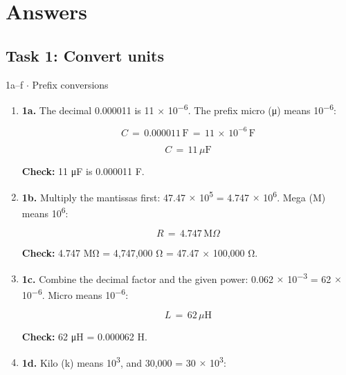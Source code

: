 \documentclass[11pt]{article}
\begin{document}
\section{Answers}
\begin{keepsection}\subsection{Task 1: Convert units}

\begin{workedbox}{1a–f \ensuremath{\cdot} Prefix conversions}
\begin{enumerate}
\item {}
\textbf{1a.} The decimal 0.000011 is 11 \ensuremath{\times} 10\textsuperscript{\ensuremath{-}6}. The prefix micro (μ) means 10\textsuperscript{\ensuremath{-}6}:

\begin{equation*}{C}\, =\, 0.000011\, \mathrm{F}\, =\, 11\, \times \, 10^{-6}\, \mathrm{F}\end{equation*}

\begin{equation*}{C}\, =\, 11\, μ\mathrm{F}\end{equation*}

\textbf{Check:} 11 μF is 0.000011 F.
\item {}
\textbf{1b.} Multiply the mantissas first: 47.47 \ensuremath{\times} 10\textsuperscript{5} = 4.747 \ensuremath{\times} 10\textsuperscript{6}. Mega (M) means 10\textsuperscript{6}:

\begin{equation*}{R}\, =\, 4.747\, \mathrm{M}Ω\end{equation*}

\textbf{Check:} 4.747 MΩ = 4,747,000 Ω = 47.47 \ensuremath{\times} 100,000 Ω.
\item {}
\textbf{1c.} Combine the decimal factor and the given power: 0.062 \ensuremath{\times} 10\textsuperscript{\ensuremath{-}3} = 62 \ensuremath{\times} 10\textsuperscript{\ensuremath{-}6}. Micro means 10\textsuperscript{\ensuremath{-}6}:

\begin{equation*}{L}\, =\, 62\, μ\mathrm{H}\end{equation*}

\textbf{Check:} 62 μH = 0.000062 H.
\item {}
\textbf{1d.} Kilo (k) means 10\textsuperscript{3}, and 30,000 = 30 \ensuremath{\times} 10\textsuperscript{3}:


\end{enumerate}
\end{workedbox}
\end{keepsection}
\end{document}
